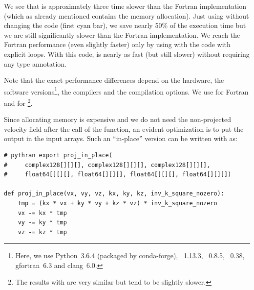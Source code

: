 We see that  is approximately three time slower than the Fortran
implementation (which as already mentioned contains the memory allocation).
%
Just using  without changing the code (first cyan bar), we save
nearly 50\% of the execution time but we are still significantly slower than
the Fortran implementation.
%
We reach the Fortran performance (even slightly faster) only by using
 with the code with explicit loops.
%
With this code,  is nearly as fast (but still slower) without
requiring any type annotation.

Note that the exact performance differences depend on the hardware, the software
versions\footnote{Here, we use Python~3.6.4 (packaged by conda-forge),
~1.13.3, ~0.8.5, ~0.38, gfortran~6.3 and
clang~6.0.}, the compilers and the compilation options.
%
We use  for Fortran and
 for \footnote{The results
with  are very similar but tend to be slightly
slower.}.
%


Since allocating memory is expensive and we do not need the non-projected
velocity field after the call of the function, an evident optimization is to
put the output in the input arrays.  Such an ``in-place'' version can be written
with  as:
\begin{verbatim}
# pythran export proj_in_place(
#     complex128[][][], complex128[][][], complex128[][][],
#     float64[][][], float64[][][], float64[][][], float64[][][])

def proj_in_place(vx, vy, vz, kx, ky, kz, inv_k_square_nozero):
    tmp = (kx * vx + ky * vy + kz * vz) * inv_k_square_nozero
    vx -= kx * tmp
    vy -= ky * tmp
    vz -= kz * tmp
\end{verbatim}

